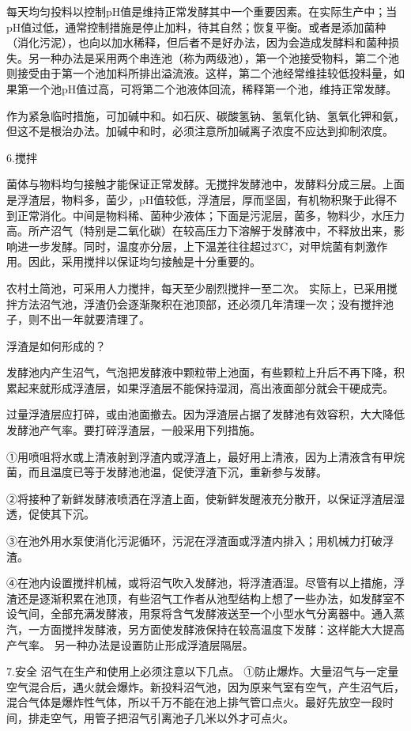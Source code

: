 \documentclass{ctexbook}
\begin{document}
每天均匀投料以控制pH值是维持正常发酵其中一个重要因素。在实际生产中；当pH值过低，通常控制措施是停止加料，待其自然；恢复平衡。或者是添加菌种（消化污泥），也向以加水稀释，但后者不是好办法，因为会造成发酵料和菌种损失。另一种办法是采用两个串连池（称为两级池），第一个池接受物料，第二个池则接受由于第一个池加料所排出溢流液。这样，第二个池经常维挂较低投料量，如果第一个池pH值过高，可将第二个池液体回流，稀释第一个池，维持正常发酵。

作为紧急临时措施，可加碱中和。如石灰、碳酸氢钠、氢氧化钠、氢氧化钾和氨，但这不是根治办法。加碱中和时，必须注意所加碱离子浓度不应达到抑制浓度。

6.搅拌

菌体与物料均匀接触才能保证正常发酵。无搅拌发酵池中，发酵料分成三层。上面是浮渣层，物料多，菌少，pH值较低，浮渣层，厚而坚固，有机物积聚于此得不到正常消化。中间是物料稀、菌种少液体；下面是污泥层，菌多，物料少，水压力高。所产沼气（特别是二氧化碳）在较高压力下溶解于发酵液中，不释放出来，影响进一步发酵。同时，温度亦分层，上下温差往往超过3℃，对甲烷菌有刺激作用。因此，采用搅拌以保证均匀接触是十分重要的。

农村土简池，可采用人力搅拌，每天至少剧烈搅拌一至二次。
实际上，已采用搅拌方法沼气池，浮渣仍会逐渐聚积在池顶部，还必须几年清理一次；没有搅拌池子，则不出一年就要清理了。

浮渣是如何形成的？

发酵池内产生沼气，气泡把发酵液中颗粒带上池面，有些颗粒上升后不再下降，积累起来就形成浮渣层，如果浮渣层不能保持湿润，高出液面部分就会干硬成壳。

过量浮渣层应打碎，或由池面撤去。因为浮渣层占据了发酵池有效容积，大大降低发酵池产气率。要打碎浮渣层，一般采用下列措施。

①用喷咀将水或上清液射到浮渣内或浮渣上，最好用上清液，因为上清液含有甲烷菌，而且温度已等于发酵池池温，促使浮渣下沉，重新参与发酵。

②将接种了新鲜发酵液喷洒在浮渣上面，使新鲜发醒液充分散开，以保证浮渣层湿透，促使其下沉。

③在池外用水泵使消化污泥循环，污泥在浮渣面或浮渣内排入；用机械力打破浮渣。

④在池内设置搅拌机械，或将沼气吹入发酵池，将浮渣酒湿。尽管有以上措施，浮渣还是逐渐积累在池顶，有些沼气工作者从池型结构上想了一些办法，如发酵室不设气间，全部充满发酵液，用泵将含气发酵液送至一个小型水气分离器中。通入蒸汽，一方面搅拌发酵液，另方面使发酵液保持在较高温度下发酵：这样能大大提高产气率。
另一种办法是设置防止形成浮渣层隔层。

7.安全
沼气在生产和使用上必须注意以下几点。
①防止爆炸。大量沼气与一定量空气混合后，遇火就会爆炸。新投料沼气池，因为原来气室有空气，产生沼气后，混合气体是爆炸性气体，所以千万不能在池上排气管口点火。最好先放空一段时间，排走空气，用管子把沼气引离池子几米以外才可点火。
\end{document}
